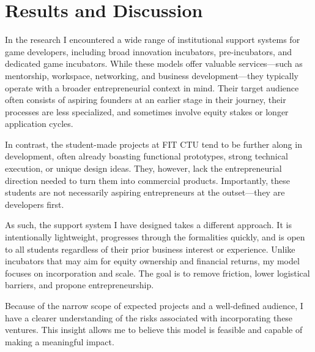 
\chapter*{Results and Discussion}
In the research I encountered a wide range of institutional support systems for game developers, including broad innovation incubators, pre-incubators, and dedicated game incubators. While these models offer valuable services—such as mentorship, workspace, networking, and business development—they typically operate with a broader entrepreneurial context in mind. Their target audience often consists of aspiring founders at an earlier stage in their journey, their processes are less specialized, and sometimes involve equity stakes or longer application cycles.

In contrast, the student-made projects at FIT CTU tend to be further along in development, often already boasting functional prototypes, strong technical execution, or unique design ideas. They, however, lack the entrepreneurial direction needed to turn them into commercial products. Importantly, these students are not necessarily aspiring entrepreneurs at the outset—they are developers first.

As such, the support system I have designed takes a different approach. It is intentionally lightweight, progresses through the formalities quickly, and is open to all students regardless of their prior business interest or experience. Unlike incubators that may aim for equity ownership and financial returns, my model focuses on incorporation and scale. The goal is to remove friction, lower logistical barriers, and propone entrepreneurship.

Because of the narrow scope of expected projects and a well-defined audience, I have a clearer understanding of the risks associated with incorporating these ventures. This insight allows me to believe this model is feasible and capable of making a meaningful impact.

